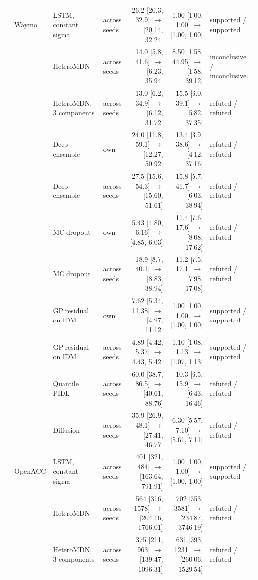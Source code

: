 \begin{longtable}{llllrrl}
\midrule
 & Waymo & LSTM, constant sigma & across seeds & 26.2 [20.3, 32.9] $\rightarrow$ [20.14, 32.24] & 1.00 [1.00, 1.00] $\rightarrow$ [1.00, 1.00] & supported / supported \\
 &  & HeteroMDN & across seeds & 14.0 [5.8, 41.6] $\rightarrow$ [6.23, 35.94] & 8.50 [1.58, 44.95] $\rightarrow$ [1.58, 39.12] & inconclusive / inconclusive \\
 &  & HeteroMDN, 3 components & across seeds & 13.0 [6.2, 34.9] $\rightarrow$ [6.12, 31.72] & 15.5 [6.0, 39.1] $\rightarrow$ [5.82, 37.35] & refuted / refuted \\
 &  & Deep ensemble & own & 24.0 [11.8, 59.1] $\rightarrow$ [12.27, 50.92] & 13.4 [3.9, 38.6] $\rightarrow$ [4.12, 37.16] & refuted / refuted \\
 &  & Deep ensemble & across seeds & 27.5 [15.6, 54.3] $\rightarrow$ [15.60, 51.61] & 15.8 [5.7, 41.7] $\rightarrow$ [6.03, 38.94] & refuted / refuted \\
 &  & MC dropout & own & 5.43 [4.80, 6.16] $\rightarrow$ [4.85, 6.03] & 11.4 [7.6, 17.6] $\rightarrow$ [8.08, 17.62] & refuted / refuted \\
 &  & MC dropout & across seeds & 18.9 [8.7, 40.1] $\rightarrow$ [8.83, 38.94] & 11.2 [7.5, 17.1] $\rightarrow$ [7.98, 17.08] & refuted / refuted \\
 &  & GP residual on IDM & own & 7.62 [5.34, 11.38] $\rightarrow$ [4.97, 11.12] & 1.00 [1.00, 1.00] $\rightarrow$ [1.00, 1.00] & supported / supported \\
 &  & GP residual on IDM & across seeds & 4.89 [4.42, 5.37] $\rightarrow$ [4.43, 5.42] & 1.10 [1.08, 1.13] $\rightarrow$ [1.07, 1.13] & supported / supported \\
 &  & Quantile PIDL & across seeds & 60.0 [38.7, 86.5] $\rightarrow$ [40.61, 88.76] & 10.3 [6.5, 15.9] $\rightarrow$ [6.43, 16.46] & refuted / refuted \\
 &  & Diffusion & across seeds & 35.9 [26.9, 48.1] $\rightarrow$ [27.41, 46.77] & 6.30 [5.57, 7.10] $\rightarrow$ [5.61, 7.11] & refuted / refuted \\
\midrule
 & OpenACC & LSTM, constant sigma & across seeds & 401 [321, 484] $\rightarrow$ [163.64, 791.91] & 1.00 [1.00, 1.00] $\rightarrow$ [1.00, 1.00] & supported / supported \\
 &  & HeteroMDN & across seeds & 564 [316, 1578] $\rightarrow$ [204.16, 1766.01] & 702 [353, 3581] $\rightarrow$ [234.87, 3746.19] & refuted / refuted \\
 &  & HeteroMDN, 3 components & across seeds & 375 [211, 963] $\rightarrow$ [139.47, 1096.31] & 631 [393, 1231] $\rightarrow$ [260.06, 1529.54] & refuted / refuted \\

\end{longtable}
